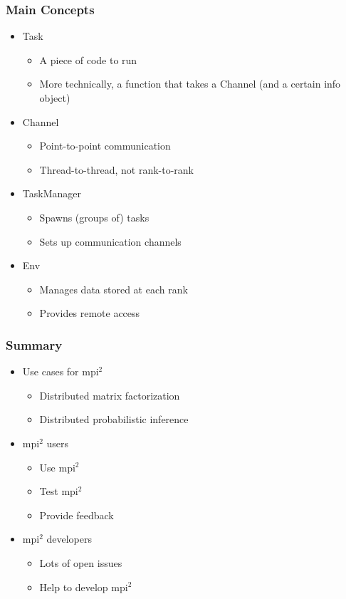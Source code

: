 \documentclass[t,fleqn]{beamer}
\begin{document}
\begin{frame}[fragile]\frametitle{Main Concepts}
  \begin{itemize}
  \item Task
    \begin{itemize}
    \item A piece of code to run
    \item More technically, a function that takes a Channel (and a certain info object)
    \end{itemize}
  \item Channel
    \begin{itemize}
    \item Point-to-point communication
    \item Thread-to-thread, not rank-to-rank
    \end{itemize}
  \item TaskManager
    \begin{itemize}
    \item Spawns (groups of) tasks
    \item Sets up communication channels
    \end{itemize}
  \item Env
    \begin{itemize}
    \item Manages data stored at each rank
    \item Provides remote access
    \end{itemize}
  \end{itemize}
\end{frame}

\begin{frame}\frametitle{Summary}
  \begin{itemize}
  \item Use cases for mpi$^2$
    \begin{itemize}
    \item Distributed matrix factorization
    \item Distributed probabilistic inference
    \end{itemize}
  \item mpi$^2$ users
    \begin{itemize}
    \item Use mpi$^2$
    \item Test mpi$^2$
    \item Provide feedback
    \end{itemize}
  \item mpi$^2$ developers
    \begin{itemize}
    \item Lots of open issues
    \item Help to develop mpi$^2$
    \end{itemize}
  \end{itemize}  
\end{frame}
\end{document}
